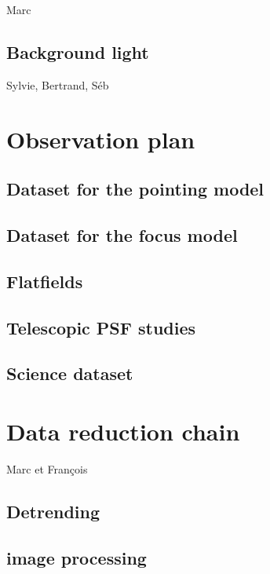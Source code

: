 \documentclass[\docopts]{\docclass}
\begin{document}
Marc

\subsection{Background light}
\label{sec:background}

Sylvie, Bertrand, Séb

\section{Observation plan}
\label{sec:plan}

\subsection{Dataset for the pointing model}
\label{sec:pointingmodel}

\subsection{Dataset for the focus model}
\label{sec:focusmodel}

\subsection{Flatfields}
\label{sec:flatfields}

\subsection{Telescopic PSF studies}


\subsection{Science dataset}
\label{sec:data}

\section{Data reduction chain}
\label{sec:dataanalysis}

Marc et François
\subsection{Detrending}
\label{sec:detrending}

\subsection{image processing}
\label{sec:processing}
\end{document}
